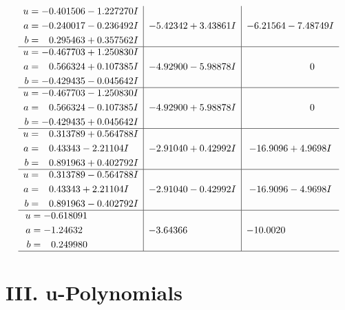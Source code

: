 \documentclass[1p]{elsarticle_modified}
\theoremstyle{definition}
\begin{document}
$$\begin{array}{c|c|c}
\begin{aligned}
u &= -0.401506 - 1.227270 I \\
a &= -0.240017 - 0.236492 I \\
b &= \phantom{-}0.295463 + 0.357562 I\end{aligned}
 & -5.42342 + 3.43861 I & -6.21564 - 7.48749 I \\ \hline\begin{aligned}
u &= -0.467703 + 1.250830 I \\
a &= \phantom{-}0.566324 + 0.107385 I \\
b &= -0.429435 - 0.045642 I\end{aligned}
 & -4.92900 - 5.98878 I & \phantom{-0.000000 } 0 \\ \hline\begin{aligned}
u &= -0.467703 - 1.250830 I \\
a &= \phantom{-}0.566324 - 0.107385 I \\
b &= -0.429435 + 0.045642 I\end{aligned}
 & -4.92900 + 5.98878 I & \phantom{-0.000000 } 0 \\ \hline\begin{aligned}
u &= \phantom{-}0.313789 + 0.564788 I \\
a &= \phantom{-}0.43343 - 2.21104 I \\
b &= \phantom{-}0.891963 + 0.402792 I\end{aligned}
 & -2.91040 + 0.42992 I & -16.9096 + 4.9698 I \\ \hline\begin{aligned}
u &= \phantom{-}0.313789 - 0.564788 I \\
a &= \phantom{-}0.43343 + 2.21104 I \\
b &= \phantom{-}0.891963 - 0.402792 I\end{aligned}
 & -2.91040 - 0.42992 I & -16.9096 - 4.9698 I \\ \hline\begin{aligned}
u &= -0.618091\phantom{ +0.000000I} \\
a &= -1.24632\phantom{ +0.000000I} \\
b &= \phantom{-}0.249980\phantom{ +0.000000I}\end{aligned}
 & -3.64366\phantom{ +0.000000I} & -10.0020\phantom{ +0.000000I}\\
 \hline 
 \end{array}$$\newpage
\newpage\renewcommand{\arraystretch}{1}
\centering \section*{ III. u-Polynomials}
\end{document}
